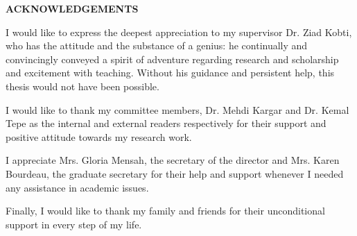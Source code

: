 \newpage
{}

{
	\centering
	\fontsize{17.5}{0}
	\textbf{ACKNOWLEDGEMENTS}
	
\par}

I would like to express the deepest appreciation to my supervisor Dr. Ziad Kobti, who has the attitude and the substance of a genius: he continually and convincingly conveyed a spirit of adventure regarding research and scholarship and excitement with teaching. Without his guidance and persistent help, this thesis would not have been possible.
\newline
\par I would like to thank my committee members, Dr. Mehdi Kargar and Dr. Kemal Tepe as the internal and external readers respectively for their support and positive attitude towards my research work.
\newline
\par I appreciate Mrs. Gloria Mensah, the secretary of the director and Mrs. Karen Bourdeau, the graduate secretary for their help and support whenever I needed any assistance in academic issues.
\par Finally, I would like to thank my family and friends for their unconditional support in every step of my life.
\newpage
\renewcommand{\headheight}{0pt}
%
